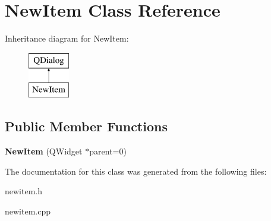\hypertarget{class_new_item}{}\section{New\+Item Class Reference}
\label{class_new_item}
Inheritance diagram for New\+Item\+:\begin{figure}[H]
\begin{center}
\leavevmode
\includegraphics[height=2.000000cm]{class_new_item}
\end{center}
\end{figure}
\subsection*{Public Member Functions}
\begin{DoxyCompactItemize}
\item 
{\bfseries New\+Item} (Q\+Widget $\ast$parent=0)\hypertarget{class_new_item_a792dbfc3ee2cf1ca3759bb6bb48a92d2}{}\label{class_new_item_a792dbfc3ee2cf1ca3759bb6bb48a92d2}

\end{DoxyCompactItemize}


The documentation for this class was generated from the following files\+:\begin{DoxyCompactItemize}
\item 
newitem.\+h\item 
newitem.\+cpp\end{DoxyCompactItemize}
